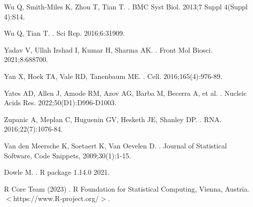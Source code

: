 \documentclass[10pt,letterpaper]{article}
\begin{document}
\begin{thebibliography}{10}
Wu Q, Smith-Miles K, Zhou T, Tian T.
.
\newblock BMC Syst Biol. 2013;7 Suppl 4(Suppl 4):S14.

Wu Q, Tian T.
.
\newblock Sci Rep. 2016;6:31909.

Yadav V, Ullah Irshad I, Kumar H, Sharma AK.
.
\newblock Front Mol Biosci. 2021;8:688700.

Yan X, Hoek TA, Vale RD, Tanenbaum ME.
.
\newblock Cell. 2016;165(4):976-89.

Yates AD, Allen J, Amode RM, Azov AG, Barba M, Becerra A, et al.
.
\newblock Nucleic Acids Res. 2022;50(D1):D996-D1003.

Zupanic A, Meplan C, Huguenin GV, Hesketh JE, Shanley DP.
.
\newblock RNA. 2016;22(7):1076-84.

Van den Meersche K, Soetaert K, Van Oevelen D.
.
\newblock Journal of Statistical Software, Code Snippets, 2009;30(1):1-15.
  
Dowle M.
.
\newblock R package 1.14.0 2021.

R Core Team (2023)
.
\newblock R Foundation for Statistical Computing, Vienna, Austria. $<$https://www.R-project.org/$>$.

\end{thebibliography}
\end{document}
